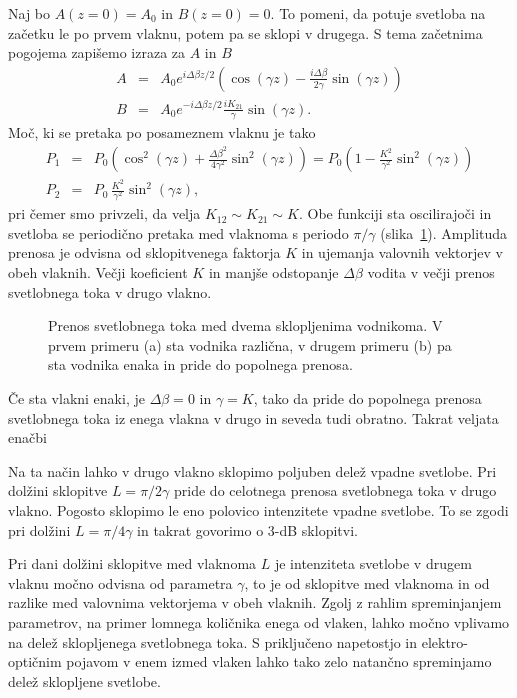 Naj bo $A(z=0) = A_0$ in $B(z=0)=0$. To pomeni, da potuje svetloba na začetku
le po prvem vlaknu, potem pa se sklopi v drugega. S tema začetnima pogojema zapišemo izraza 
za $A$ in $B$
\begin{eqnarray}
A &=& A_0 e^{i \Delta \beta z/2} \left( \cos(\gamma z) - 
\frac{i \Delta \beta}{2 \gamma}\sin(\gamma z) \right)\\
B &= & A_0 e^{-i \Delta \beta z/2} \frac{i K_{21}}{\gamma}\sin(\gamma z).
\end{eqnarray}
Moč, ki se pretaka po posameznem vlaknu je tako
\begin{eqnarray}
P_1 &=& P_0 \left( \cos^2(\gamma z) + \frac{\Delta \beta^2}{4 \gamma^2}\sin^2(\gamma z) \right)
= P_0 \left( 1 - \frac{K^2}{\gamma^2}\sin^2(\gamma z) \right)\\
P_2 &= & P_0\, \frac{K^2}{\gamma^2}\sin^2(\gamma z),
\end{eqnarray}
pri čemer smo privzeli, da velja $K_{12} \sim K_{21} \sim K$. 
Obe funkciji sta oscilirajoči in svetloba se periodično pretaka med vlaknoma
s periodo $\pi/\gamma$ (slika~\ref{fig:foscil}). Amplituda prenosa je 
odvisna od sklopitvenega faktorja $K$ in ujemanja valovnih vektorjev v obeh vlaknih. Večji koeficient $K$
in manjše odstopanje $\Delta \beta$ vodita v večji prenos svetlobnega toka v drugo vlakno. 
\begin{figure}[h!]
\centering
\def\svgwidth{140truemm} 
 
\caption{Prenos svetlobnega toka med dvema sklopljenima vodnikoma. V prvem primeru (a) sta
vodnika različna, v drugem primeru (b) pa sta vodnika enaka in pride do popolnega prenosa.}
\label{fig:foscil}
\end{figure}

Če sta vlakni 
enaki, je $\Delta \beta = 0$ in $\gamma = K$, tako da pride do popolnega prenosa
svetlobnega toka iz enega vlakna v drugo in seveda tudi obratno.
Takrat veljata enačbi

Na ta način lahko v drugo vlakno sklopimo poljuben delež vpadne svetlobe. 
Pri dolžini sklopitve $L = \pi/2 \gamma$ pride do celotnega prenosa svetlobnega toka v drugo vlakno.
Pogosto sklopimo le eno polovico intenzitete vpadne svetlobe. To se zgodi pri dolžini 
$L = \pi/4 \gamma$ in takrat govorimo o 3-dB sklopitvi. 

\begin{remark}
 Pri dani dolžini sklopitve med vlaknoma $L$ je intenziteta svetlobe v drugem vlaknu močno odvisna od
 parametra $\gamma$, to je od sklopitve med vlaknoma in od razlike med valovnima vektorjema 
 v obeh vlaknih. Zgolj z rahlim spreminjanjem parametrov, na primer lomnega količnika enega od vlaken,
 lahko močno vplivamo na delež sklopljenega svetlobnega toka. S priključeno napetostjo in elektro-optičnim
 pojavom v enem izmed vlaken lahko tako zelo natančno spreminjamo delež sklopljene svetlobe. 
\end{remark}

